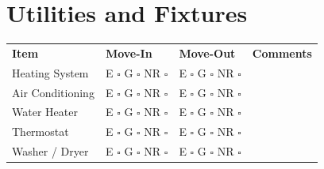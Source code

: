 
\section*{Utilities and Fixtures}
\label{sec:utilities}

\begin{longtable}{p{6cm} p{3cm} p{3cm} p{4cm}}
\textbf{Item} & \textbf{Move-In} & \textbf{Move-Out} & \textbf{Comments} \\
Heating System & E $\square$ G $\square$ NR $\square$ & E $\square$ G $\square$ NR $\square$ & \\
Air Conditioning & E $\square$ G $\square$ NR $\square$ & E $\square$ G $\square$ NR $\square$ & \\
Water Heater & E $\square$ G $\square$ NR $\square$ & E $\square$ G $\square$ NR $\square$ & \\
Thermostat & E $\square$ G $\square$ NR $\square$ & E $\square$ G $\square$ NR $\square$ & \\
Washer / Dryer & E $\square$ G $\square$ NR $\square$ & E $\square$ G $\square$ NR $\square$ & \\
\end{longtable}

